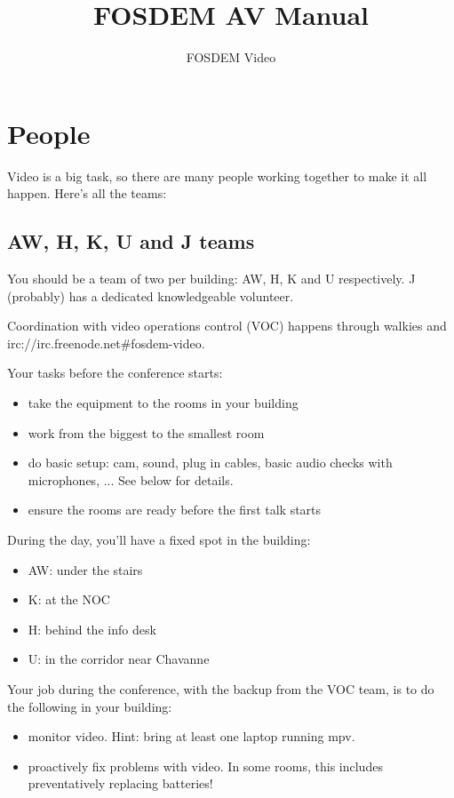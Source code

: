 \documentclass{article}
\title{FOSDEM AV Manual}
\author{FOSDEM Video}
\begin{document}
\maketitle \thispagestyle{empty}
\newpage

\tableofcontents
\newpage

\section{People}
Video is a big task, so there are many people working together to make it all happen. Here's all the teams:

\subsection{AW, H, K, U and J teams}
You should be a team of two per building: AW, H, K and U respectively. J (probably) has a dedicated knowledgeable volunteer.

Coordination with video operations control (VOC) happens through walkies and irc://irc.freenode.net\#fosdem-video.

Your tasks before the conference starts:
\begin{itemize}
  \item take the equipment to the rooms in your building
  \item work from the biggest to the smallest room
  \item do basic setup: cam, sound, plug in cables, basic audio checks with microphones, ... See below for details.
  \item ensure the rooms are ready before the first talk starts
\end{itemize}

During the day, you'll have a fixed spot in the building:
\begin{itemize}
  \item AW: under the stairs
  \item K: at the NOC
  \item H: behind the info desk
  \item U: in the corridor near Chavanne
\end{itemize}

Your job during the conference, with the backup from the VOC team, is to do the following in your building:
\begin{itemize}
  \item monitor video. Hint: bring at least one laptop running mpv.
  \item proactively fix problems with video. In some rooms, this includes preventatively replacing batteries!
\end{itemize}
\end{document}
